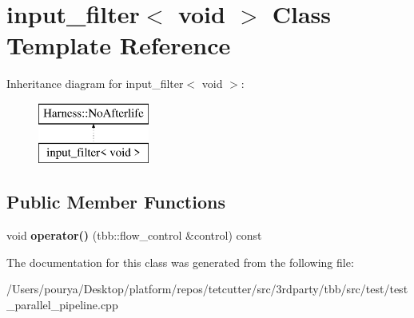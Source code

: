 \hypertarget{classinput__filter_3_01void_01_4}{}\section{input\+\_\+filter$<$ void $>$ Class Template Reference}
\label{classinput__filter_3_01void_01_4}
Inheritance diagram for input\+\_\+filter$<$ void $>$\+:\begin{figure}[H]
\begin{center}
\leavevmode
\includegraphics[height=2.000000cm]{classinput__filter_3_01void_01_4}
\end{center}
\end{figure}
\subsection*{Public Member Functions}
\begin{DoxyCompactItemize}
\item 
\hypertarget{classinput__filter_3_01void_01_4_af604b5add8bc030a19efa098e4180b24}{}void {\bfseries operator()} (tbb\+::flow\+\_\+control \&control) const \label{classinput__filter_3_01void_01_4_af604b5add8bc030a19efa098e4180b24}

\end{DoxyCompactItemize}


The documentation for this class was generated from the following file\+:\begin{DoxyCompactItemize}
\item 
/\+Users/pourya/\+Desktop/platform/repos/tetcutter/src/3rdparty/tbb/src/test/test\+\_\+parallel\+\_\+pipeline.\+cpp\end{DoxyCompactItemize}
